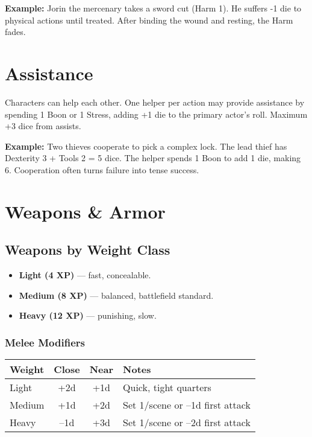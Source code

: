 \documentclass[11pt,twoside,openany]{book}
\begin{document}
\textbf{Example:} Jorin the mercenary takes a sword cut (Harm 1). He suffers -1 die to physical actions until treated. After binding the wound and resting, the Harm fades.

\section*{Assistance} 

Characters can help each other. One helper per action may provide assistance by spending 1 Boon or 1 Stress, adding +1 die to the primary actor's roll. Maximum +3 dice from assists.

\textbf{Example:} Two thieves cooperate to pick a complex lock. The lead thief has Dexterity 3 + Tools 2 = 5 dice. The helper spends 1 Boon to add 1 die, making 6. Cooperation often turns failure into tense success.

\section*{Weapons \& Armor} 

\subsection*{Weapons by Weight Class}

\begin{itemize}
\item \textbf{Light (4 XP)} — fast, concealable.
\item \textbf{Medium (8 XP)} — balanced, battlefield standard.
\item \textbf{Heavy (12 XP)} — punishing, slow.
\end{itemize}

\subsubsection*{Melee Modifiers}

\begin{center}
\begin{tabular}{|l|c|c|l|}
\hline
\textbf{Weight} & \textbf{Close} & \textbf{Near} & \textbf{Notes} \\
\hline
Light & +2d & +1d & Quick, tight quarters \\
Medium & +1d & +2d & Set 1/scene or –1d first attack \\
Heavy & –1d & +3d & Set 1/scene or –2d first attack \\
\hline
\end{tabular}
\end{center}
\end{document}

